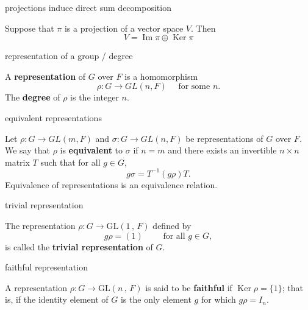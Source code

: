 \documentclass[avery5371,grid]{flashcards}
\newcommand{\GLnF}[2]{\ensuremath{\textrm{GL} \left( #1 \, , \, #2 \right)}}
\DeclareMathOperator{\Ker}{\ensuremath{\textrm{Ker}}}
\DeclareMathOperator{\Img}{\ensuremath{\textrm{Im}}}
\newcommand{\defn}[1]{\textbf{#1}}
\begin{document}
\begin{flashcard}[Proposition]{projections induce direct sum decomposition}

  Suppose that $\pi$ is a projection of a vector space $V$. Then
  \[
    V = \Img \pi \oplus \Ker \pi
  \]

\end{flashcard}

\begin{flashcard}[Definition]{representation of a group / degree}

  A \defn{representation} of $G$ over $F$ is a homomorphism
  \[
    \rho : G \to GL(n, F) \quad \text{ for some } n.
  \]
  The \defn{degree} of $\rho$ is the integer $n$.

\end{flashcard}

\begin{flashcard}[Definition]{equivalent representations}

  Let $\rho : G \to GL(m, F)$ and $\sigma : G \to GL(n, F)$ be
  representations of $G$ over $F$. We say that $\rho$ is
  \defn{equivalent} to $\sigma$ if $n=m$ and there exists an
  invertible $n\times n$ matrix $T$ such that for all $g \in G$,
  \[
    g\sigma = T^{-1}(g\rho)T.
  \]
  Equivalence of representations is an equivalence relation.

\end{flashcard}

\begin{flashcard}[Definition]{trivial representation}

  The representation $\rho: G \to \GLnF{1}{F}$ defined by
  \[
    g \rho = (1)\qquad \text{ for all } g \in G,
  \]
  is called the \defn{trivial representation} of $G$.

\end{flashcard}

\begin{flashcard}[Definition]{faithful representation}

  A representation $\rho : G \to \GLnF{n}{F}$ is said to be
  \defn{faithful} if $\Ker{\rho} = \{ 1 \}$; that is, if the identity
  element of $G$ is the only element $g$ for which $g\rho = I_n$.

\end{flashcard}
\end{document}
